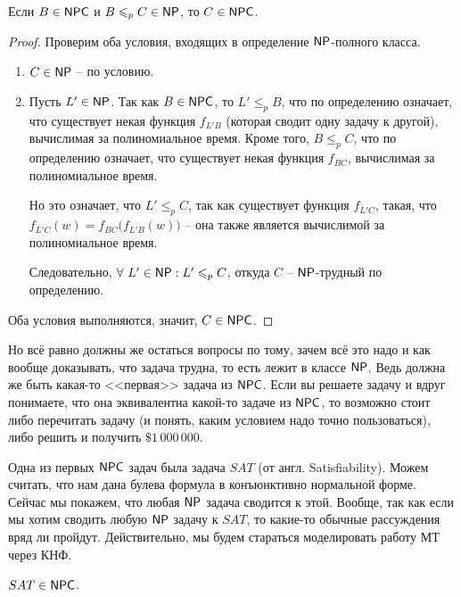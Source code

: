 \documentclass[a4paper, 12pt]{article}
\begin{document}
\begin{Lemma}
Если $B \in \mathsf{NPC}$ и $B \leqslant_p C \in \mathsf{NP}$, то $C \in \mathsf{NPC}$.
\end{Lemma}
\begin{proof}
  Проверим оба условия, входящих в определение $\mathsf{NP}$-полного класса.
  \begin{enumerate}
    \item $C \in \mathsf{NP}$ -- по условию.
    \item Пусть $L' \in \mathsf{NP}$. Так как $B \in \mathsf{NPC}$, то $L' 
    \leqslant_p B$, что по определению означает, что существует некая 
    функция $f_{L'B}$
    (которая сводит одну задачу к другой), вычислимая за полиномиальное 
    время. Кроме того, $B \leqslant_p C$, что по определению означает, что 
    существует некая функция $f_{BC}$, вычислимая за полиномиальное время.
        
    Но это означает, что $L' \leqslant_p C$, так как существует функция 
    $f_{L'C}$, такая, что $f_{L'C}(w) = f_{BC}\big(f_{L'B}(w)\big)$ -- она 
    также является вычислимой за полиномиальное время.
        
    Следовательно, $\forall\ L' \in \mathsf{NP}: L' \leqslant_p C$, откуда 
    $C$ -- $\mathsf{NP}$-трудный по определению.
  \end{enumerate}
  Оба условия выполняются, значит, $C \in \mathsf{NPC}$.
\end{proof}

Но всё равно должны же остаться вопросы по тому, зачем всё это надо и как
вообще доказывать, что задача трудна, то есть лежит в классе $\mathsf{NP}$. 
Ведь должна же быть какая-то <<первая>> задача из $\mathsf{NPC}$. Если вы решаете
задачу и вдруг понимаете, что она эквивалентна какой-то задаче из $\mathsf{NPC}$,
то возможно стоит либо перечитать задачу (и понять, каким условием
надо точно пользоваться), либо решить и получить $\$1\,000\,000$.

Одна из первых $\mathsf{NPC}$ задач была задача $SAT$ (от англ.
Satisfiability). Можем считать, что нам
дана булева формула в конъюнктивно нормальной форме. Сейчас мы покажем, что
любая $\mathsf{NP}$ задача сводится к этой. Вообще, так как если мы хотим сводить
любую $\mathsf{NP}$ задачу к $SAT$, то какие-то обычные рассуждения вряд ли пройдут.
Действительно, мы будем стараться моделировать работу МТ через КНФ.

\begin{Theorem}
  $SAT \in \mathsf{NPC}$.
\end{Theorem}
\end{document}
